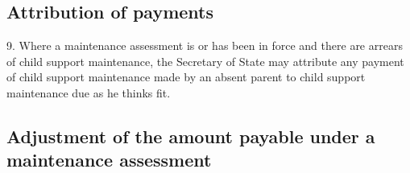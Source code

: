 \documentclass[a4paper]{article}
\newcommand{\parthead}{}
\begin{document}
\renewcommand\parthead{--- Part III}

\subsection[9. Attribution of payments]{Attribution of payments}

9.  Where a maintenance assessment is or has been in force and there are arrears of child support maintenance, the Secretary of State may attribute any payment of child support maintenance made by an absent parent to child support maintenance due as he thinks fit.

\subsection[10. Adjustment of the amount payable under a maintenance assessment]{Adjustment of the amount payable under a maintenance assessment}

%
%
%
%
%
%
\end{document}
